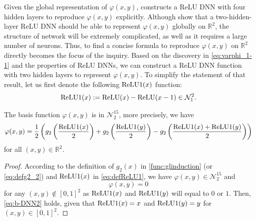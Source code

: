 Given the global representation of $\varphi(x,y)$, \cite{he2019finite} constructs 
a ReLU DNN with four hidden layers to reproduce $\varphi(x,y)$ explicitly. 
Although \cite{arora2018understanding,he2020relu} show that
a two-hidden-layer ReLU DNN should be able to represent $\varphi(x,y)$ globally on $\mathbb{R}^2$,
the structure of network will be extremely complicated, as well as it requires a 
large number of neurons. Thus, to find a concise formula to 
reproduce $\varphi(x,y)$ on $\mathbb{R}^2$ directly becomes the focus of the inquiry.
Based on the discovery in \eqref{eq:varphi_1-1} and the properties of ReLU DNNs, 
we can construct a ReLU DNN function with two hidden layers to represent $\varphi(x,y)$. 
To simplify the statement of that result, let us first denote the following
${\rm ReLU1}(x)$ function:
\begin{equation}\label{eq:defReLU1}
	{\rm ReLU1}(x)  := {\rm ReLU}(x) - {\rm ReLU}(x-1) \in {\mathcal N}_1^2.
\end{equation}

\begin{lemma}
	The basis function $\varphi(x,y)$ is in  ${\mathcal N}_2^{15}$, more precisely, we have
	\begin{equation}\label{eq:b-DNN2}
		{\varphi}(x,y) = \frac{1}{2}\left(g_{2}\left(\frac{{\rm ReLU1}(x)}{2}\right)+g_2\left(\frac{{\rm ReLU1}(y)}{2}\right)-g_2\left(\frac{{\rm ReLU1}(x)+{\rm ReLU1}(y)}{2}\right)\right)
	\end{equation}
	for all $(x,y) \in \mathbb{R}^2$. 
\end{lemma}
\begin{proof}
	According to the definition of $g_2(x)$ in \eqref{func:glinduction} (or \eqref{eq:defg2_2}) and ${\rm ReLU1}(x)$ in \eqref{eq:defReLU1},
	we have $ \varphi(x,y) \in {\mathcal N}_2^{15}$ and
	\begin{equation}\label{key}
		\varphi(x,y) = 0
	\end{equation}
	for any $(x,y) \notin [0,1]^2$ as ${\rm ReLU1}(x)$ and ${\rm ReLU1}(y)$ will equal to $0$ or $1$. 
	Then, \eqref{eq:b-DNN2} holds, given that ${\rm ReLU1}(x) = x$ and ${\rm ReLU1}(y) = y$ for $(x,y) \in [0,1]^2$.
\end{proof}

